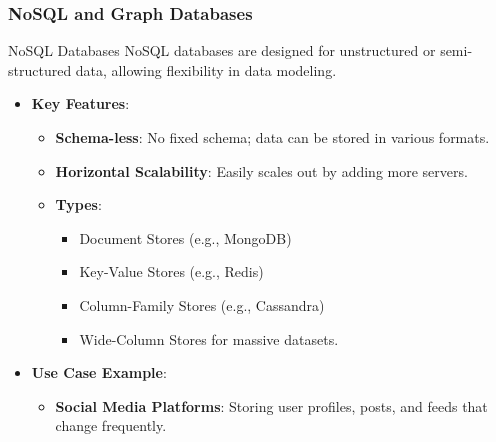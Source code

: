 \documentclass[aspectratio=169]{beamer}
\begin{document}
\begin{frame}[fragile]
    \frametitle{NoSQL and Graph Databases}
    \begin{block}{NoSQL Databases}
        NoSQL databases are designed for unstructured or semi-structured data, allowing flexibility in data modeling.
    \end{block}

    \begin{itemize}
        \item \textbf{Key Features}:
        \begin{itemize}
            \item \textbf{Schema-less}: No fixed schema; data can be stored in various formats.
            \item \textbf{Horizontal Scalability}: Easily scales out by adding more servers.
            \item \textbf{Types}:
            \begin{itemize}
                \item Document Stores (e.g., MongoDB)
                \item Key-Value Stores (e.g., Redis)
                \item Column-Family Stores (e.g., Cassandra)
                \item Wide-Column Stores for massive datasets.
            \end{itemize}
        \end{itemize}

        \item \textbf{Use Case Example}:
        \begin{itemize}
            \item \textbf{Social Media Platforms}: Storing user profiles, posts, and feeds that change frequently.
        \end{itemize}
    \end{itemize}
\end{frame}
\end{document}
